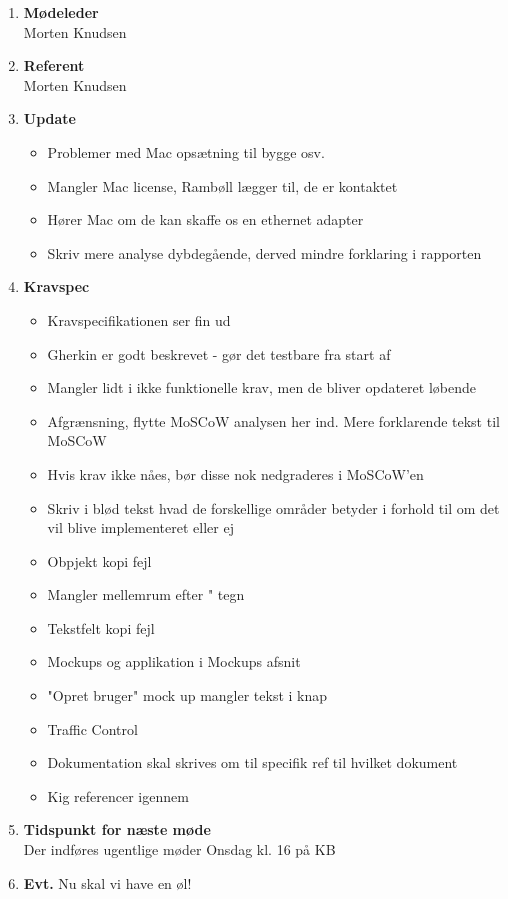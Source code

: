 	\begin{enumerate}
		\itemsep 0.3em 
		\item \textbf{Mødeleder}\\
			Morten Knudsen
		\item \textbf{Referent}\\
			Morten Knudsen

		\item \textbf{Update}
			\begin{itemize}[-]
			\item Problemer med Mac opsætning til bygge osv. \\
			\item Mangler Mac license, Rambøll lægger til, de er kontaktet \\
			\item Hører Mac om de kan skaffe os en ethernet adapter \\
			
			\item Skriv mere analyse dybdegående, derved mindre forklaring i rapporten
		\end{itemize}
	
		\item \textbf{Kravspec}
		\begin{itemize}[-]
			\item Kravspecifikationen ser fin ud
			\item Gherkin er godt beskrevet - gør det testbare fra start af
			\item Mangler lidt i ikke funktionelle krav, men de bliver opdateret løbende
			\item Afgrænsning, flytte MoSCoW analysen her ind. Mere forklarende tekst til MoSCoW
			\item Hvis krav ikke nåes, bør disse nok nedgraderes i MoSCoW'en
			\item Skriv i blød tekst hvad de forskellige områder betyder i forhold til om det vil blive implementeret eller ej
			\item Obpjekt kopi fejl
			\item Mangler mellemrum efter " tegn
			\item Tekstfelt kopi fejl
			\item Mockups og applikation i Mockups afsnit
			\item "Opret bruger" mock up mangler tekst i knap
			\item Traffic Control 
			\item Dokumentation skal skrives om til specifik ref til hvilket dokument  			
			\item Kig referencer igennem	
		\end{itemize}
	
		\item \textbf{Tidspunkt for næste møde} \\
			Der indføres ugentlige møder
			Onsdag kl. 16 på KB
			
		\item \textbf{Evt.}
			Nu skal vi have en øl!
	\end{enumerate}
